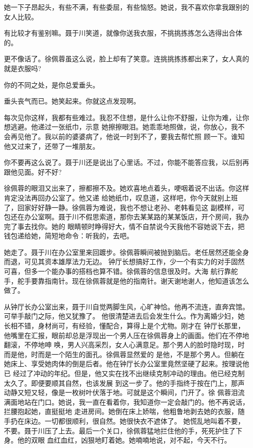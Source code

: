 \documentclass[11pt,a4paper,onecolumn]{article}
\begin{document}
她一下子昂起头，有些不满，有些委屈，有些恼怒。她说，我不喜欢你拿我跟别的女人比较。

有比较才有鉴别嘛。聂于川笑道，就像你送我衣服，不挑挑拣拣怎么选得出合体的。

更不像话了。徐佩蓉虽这么说，脸上却有了笑意。连挑挑拣拣都出来了，女人真的就是衣服吗?

你的不同之处，是你总爱垂头。

垂头丧气而已。她笑起来。你就这点发现啊。

每次见你这样，我都有些难过。我忍不住想，是什么让你不舒服，让你为难，让你想逃避。他递过一张纸巾，示意
她擦擦眼泪。她乖乖地照做，说，你放心，我不会再见他了。我以前的婆婆病了，他说一时到不了，要我去帮忙照
顾一下。谁知他又过来了，还带了一堆朋友。

你不要再这么说了。聂于川还是说出了心里话。不过，你能不能答应我，以后别再跟他见面。好不好?

徐佩蓉的眼泪又出来了，擦都擦不及。她欢喜地点着头，哽咽着说不出话。你这样肯定没法再回办公室了。他又递
给她纸巾，叹息道，这样吧，你今天就别上班了，回家好好静一静。徐佩蓉为难说，我也不想让老孙、老韩看见这
副模样，可包还在办公室啊。聂于川不假思索道，那你去某某路的某某饭店，开个房间，我办完了事去找你。她的
眼睛顿时睁得好大，情不自禁说今天我\myrule{}他不容她说下去，把钱包递给她，简短地命令：听我的，去吧。

她走了。聂于川在办公室里来回踱步。徐佩蓉瞬间被抛到脑后。老任居然还能全身而退，可见其资本雄厚法力无边。
钟厅长想搞好工作，少一个有实力的对手固然可喜，但多一个能办事的搭档也算不错。徐佩蓉的信息很及时。大海
航行靠舵手，舵手要靠指南针。现在徐佩蓉就是他的指南针。谢天谢地谢人，他知道该怎么做了。

从钟厅长办公室出来，聂于川自觉两脚生风，心旷神恰。他再不流连，直奔宾馆。可举手敲门之际，他又犹豫了。
他很清楚进去后会发生什么。作为离婚少妇，她长相不错，身材尚可，有经验，懂配合，算得上是个尤物。刚才在
钟厅长那里，他嘴里在汇报，眼前却总是浮现出一个男人压在徐佩蓉身上的画面。他们在不停地翻滚，不停地呻
唤，男人兴高采烈，女人心满意足。那个男人的脸时隐时现，时而是他，时而是一个陌生的面孔。徐佩蓉显然爱的
是他，不是那个男人。但躺在她床上、享受她肉体的倒是后者。他在钟厅长办公室里竟然坚硬了起来。按理说他已
经过了冲动的年纪。但是，他又实在找不出继续克制冲动的理由。他已经克制太久了。即便要顺其自然，也该发展
到这一步了。他的手指终于按在门上，那声动静又短又轻，像是一枚树叶伏落于地。可就是这个瞬间，门开了。徐
佩蓉泪流满面地站在门口。她说，我一直在看着你，我知道你一定会敲门的。他不再说话，拦腰抱起她，直挺挺地
走进房间。她倒在床上娇喘，他粗鲁地剥去她的衣服，随手扔在床边。一切都很顺利，很自然。她很快衣不遮体了。
她慌乱地叫着不要，不要。聂于川压了上去。最后一个关口，徐佩蓉猛地拦住他的手，死死护住了下身。他的双眼
血红血红，凶狠地盯着她。她喃喃地说，对不起，今天不行。
\end{document}
